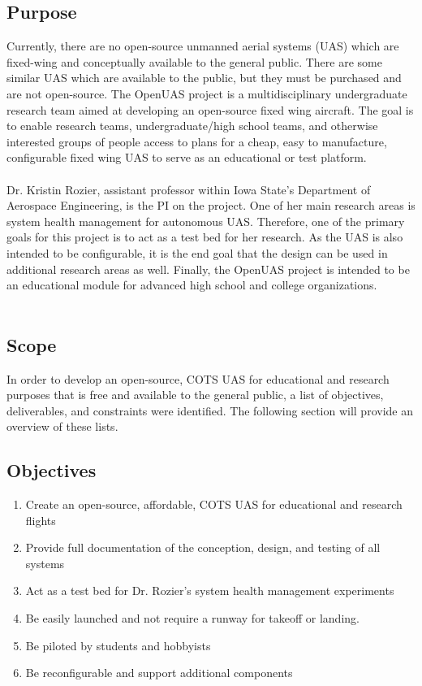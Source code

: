 \documentclass{article}
\begin{document}
\subsection{Purpose}
Currently, there are no open-source unmanned aerial systems (UAS) which are fixed-wing and conceptually available to the general public. There are some similar UAS which are available to the public, but they must be purchased and are not open-source. The OpenUAS project is a multidisciplinary undergraduate research team aimed at developing an open-source fixed wing aircraft. The goal is to enable research teams, undergraduate/high school teams, and otherwise interested groups of people access to plans for a cheap, easy to manufacture, configurable fixed wing UAS to serve as an educational or test platform.\\\\
Dr. Kristin Rozier, assistant professor within Iowa State's Department of Aerospace Engineering, is the PI on the project. One of her main research areas is system health management for autonomous UAS. Therefore, one of the primary goals for this project is to act as a test bed for her research. As the UAS is also intended to be configurable, it is the end goal that the design can be used in additional research areas as well. Finally, the OpenUAS project is intended to be an educational module for advanced high school and college organizations.\\\\

\subsection{Scope}
In order to develop an open-source, COTS UAS for educational and research purposes that is free and available to the general public, a list of objectives, deliverables, and constraints were identified. The following section will provide an overview of these lists.

\subsection{Objectives}
\begin{enumerate}
\item Create an open-source, affordable, COTS UAS for educational and research flights
\item Provide full documentation of the conception, design, and testing of all systems
\item Act as a test bed for Dr. Rozier's system health management experiments
\item Be easily launched and not require a runway for takeoff or landing.
\item Be piloted by students and hobbyists
\item Be reconfigurable and support additional components
\end{enumerate}
\end{document}
